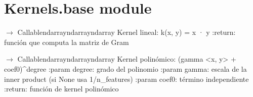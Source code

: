 \documentclass[letterpaper,10pt,english]{sphinxmanual}
\begin{document}
\section{Kernels.base module}
\label{\detokenize{Kernels:module-Kernels.base}}\label{\detokenize{Kernels:kernels-base-module}}

\begin{fulllineitems}
\label{\detokenize{Kernels:Kernels.base.linear}}
\pysigstartsignatures
\pysiglinewithargsret
{}
{}
{{ $\rightarrow$ Callable\DUrole{p}{{[}}\DUrole{p}{{[}}ndarrayndarray\DUrole{p}{{]}}ndarray\DUrole{p}{{]}}}}
\pysigstopsignatures
\sphinxAtStartPar
Kernel lineal: k(x, y) = x · y
:return: función que computa la matriz de Gram

\end{fulllineitems}


\begin{fulllineitems}
\label{\detokenize{Kernels:Kernels.base.polynomial}}
\pysigstartsignatures
\pysiglinewithargsret
{}
{\sphinxparamcomma {}\sphinxparamcomma {}}
{{ $\rightarrow$ Callable\DUrole{p}{{[}}\DUrole{p}{{[}}ndarrayndarray\DUrole{p}{{]}}ndarray\DUrole{p}{{]}}}}
\pysigstopsignatures
\sphinxAtStartPar
Kernel polinómico: (gamma \textless{}x, y\textgreater{} + coef0)\textasciicircum{}degree
:param degree: grado del polinomio
:param gamma: escala de la inner product (si None usa 1/n\_features)
:param coef0: término independiente
:return: función de kernel polinómico

\end{fulllineitems}
\end{document}
